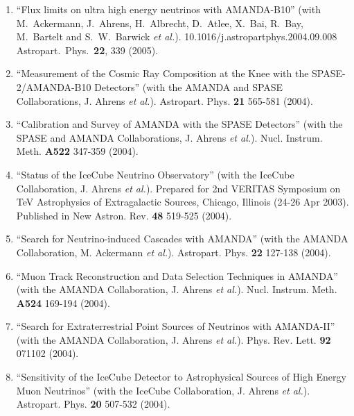 \begin{enumerate}
\item ``Flux limits on ultra high energy neutrinos with
        AMANDA-B10'' (with M.~Ackermann, J.~Ahrens,
        H.~Albrecht, D.~Atlee, X.~Bai, R.~Bay,   M.~Bartelt
        and S.~W.~Barwick {\it et al.}).
        10.1016/j.astropartphys.2004.09.008 \\{}Astropart.\
        Phys.\ {\bf     22}, 339 (2005).

\item ``Measurement of the Cosmic Ray Composition at the
        Knee with the   SPASE-2/AMANDA-B10 Detectors'' (with
        the AMANDA and SPASE   Collaborations, J. Ahrens
        {\it et al.}).  Astropart. Phys. {\bf 21}   565-581
        (2004).

\item ``Calibration and Survey of AMANDA with the SPASE
        Detectors'' (with   the SPASE and AMANDA
        Collaborations, J. Ahrens {\it et al.}).   Nucl.
        Instrum. Meth. {\bf A522} 347-359 (2004).

\item ``Status of the IceCube Neutrino Observatory'' (with
        the IceCube   Collaboration, J. Ahrens {\it et
        al.}).  Prepared for 2nd VERITAS   Symposium on TeV
        Astrophysics of Extragalactic Sources, Chicago,
        Illinois (24-26 Apr 2003).  Published in New Astron.
        Rev. {\bf 48}   519-525 (2004).

\item ``Search for Neutrino-induced Cascades with AMANDA''
        (with the   AMANDA Collaboration, M. Ackermann {\it
        et al.}).  Astropart. Phys. {\bf     22} 127-138
        (2004).

\item ``Muon Track Reconstruction and Data Selection
        Techniques in   AMANDA'' (with the AMANDA
        Collaboration, J. Ahrens {\it et al.}).   Nucl.
        Instrum. Meth. {\bf A524} 169-194 (2004).

\item ``Search for Extraterrestrial Point Sources of
        Neutrinos with   AMANDA-II'' (with the AMANDA
        Collaboration, J. Ahrens {\it et al.}).   Phys. Rev.
        Lett. {\bf 92} 071102 (2004).

\item ``Sensitivity of the IceCube Detector to Astrophysical
        Sources of   High Energy Muon Neutrinos'' (with the
        IceCube Collaboration,   J. Ahrens {\it et al.}).
        Astropart. Phys. {\bf 20} 507-532 (2004).


\end{enumerate}
